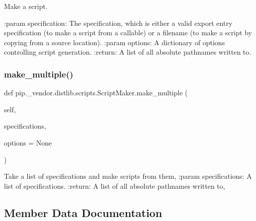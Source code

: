 \begin{DoxyVerb}Make a script.

:param specification: The specification, which is either a valid export
              entry specification (to make a script from a
              callable) or a filename (to make a script by
              copying from a source location).
:param options: A dictionary of options controlling script generation.
:return: A list of all absolute pathnames written to.
\end{DoxyVerb}
 \mbox{\label{classpip_1_1__vendor_1_1distlib_1_1scripts_1_1ScriptMaker_a47608296ced96eea37c55384a23e6f93}} 
\subsubsection{\texorpdfstring{make\+\_\+multiple()}{make\_multiple()}}
{\footnotesize\ttfamily def pip.\+\_\+vendor.\+distlib.\+scripts.\+Script\+Maker.\+make\+\_\+multiple (\begin{DoxyParamCaption}\item[{}]{self,  }\item[{}]{specifications,  }\item[{}]{options = {\ttfamily None} }\end{DoxyParamCaption})}

\begin{DoxyVerb}Take a list of specifications and make scripts from them,
:param specifications: A list of specifications.
:return: A list of all absolute pathnames written to,
\end{DoxyVerb}
 

\subsection{Member Data Documentation}
\mbox{\label{classpip_1_1__vendor_1_1distlib_1_1scripts_1_1ScriptMaker_add5715f7decd6425a02008bf4350a865}} 
